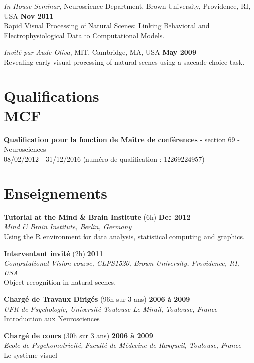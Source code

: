 \documentclass[margin,line]{resume}
\begin{document}
\begin{resume}
\newpage

	\vspace{-2mm} 
	\textit{In-House Seminar}, Neuroscience Department, Brown University, Providence, RI, USA \hfill \textbf{Nov 2011}\\
	Rapid Visual Processing of Natural Scenes: Linking Behavioral and Electrophysiological Data to Computational Models.

	\vspace{-2mm} 
	\textit{Invité par Aude Oliva}, MIT, Cambridge, MA, USA \hfill \textbf{May 2009}\\
	Revealing early visual processing of natural scenes using a saccade choice task.

	\normalsize

\vspace{3mm}
\section{\mysidestyle Qualifications\\MCF}
    \textbf{Qualification pour la fonction de Maître de conférences} - section 69 - Neurosciences\\
    08/02/2012 - 31/12/2016 (numéro de qualification : 12269224957)
    
    
\vspace{3mm}
\section{\mysidestyle Enseignements}
	
	\textbf{Tutorial at the Mind \& Brain Institute} (6h) \hfill \textbf{Dec 2012}\\
	\textsl{Mind \& Brain Institute, Berlin, Germany}\\
	Using the R environment for data analysis, statistical computing and graphics.

	\textbf{Interventant invité} (2h) \hfill \textbf{2011}\\
	\textsl{Computational Vision course, CLPS1520, Brown University, Providence, RI, USA}\\
	Object recognition in natural scenes.

	\textbf{Chargé de Travaux Dirigés} (96h sur 3 ans) \hfill \textbf{2006 à 2009}\\
	\textsl{UFR de Psychologie, Université Toulouse Le Mirail, Toulouse, France}\\
	Introduction aux Neurosciences

	\textbf{Chargé de cours} (30h sur 3 ans) \hfill \textbf{2006 à 2009}\\
	\textsl{Ecole de Psychomotricité, Faculté de Médecine de Rangueil, Toulouse, France}\\
	Le système visuel 


\end{resume}
\end{document}
